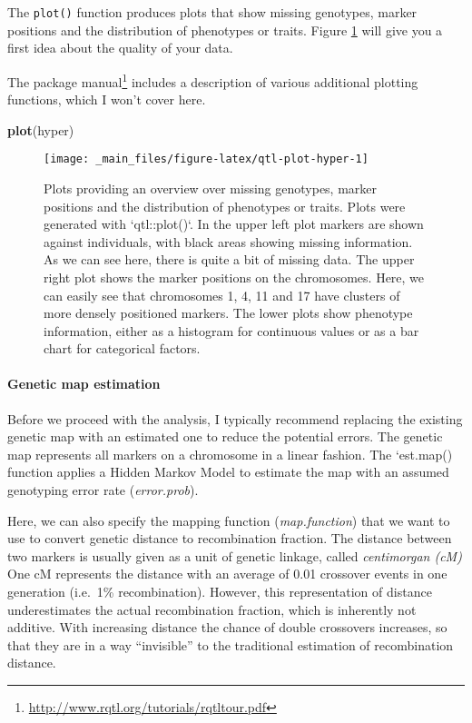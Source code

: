 \documentclass[12pt,]{krantz}
\newenvironment{Shaded}{\begin{snugshade}}{\end{snugshade}}
\newcommand{\KeywordTok}[1]{\textcolor[rgb]{0.27,0.27,0.27}{\textbf{{#1}}}}
\newcommand{\NormalTok}[1]{{#1}}
\let\oldparagraph\paragraph
\renewcommand{\paragraph}[1]{\oldparagraph{#1}\mbox{}}
\renewcommand{\href}[2]{#2\footnote{\url{#1}}}
\theoremstyle{definition}
\theoremstyle{definition}
\theoremstyle{remark}
\begin{document}
The \texttt{plot()} function produces plots that show missing genotypes,
marker positions and the distribution of phenotypes or traits. Figure
\ref{fig:qtl-plot-hyper} will give you a first idea about the quality of
your data.

The \href{http://www.rqtl.org/tutorials/rqtltour.pdf}{package manual}
includes a description of various additional plotting functions, which I
won't cover here.

\begin{Shaded}
\begin{Highlighting}[]
\KeywordTok{plot}\NormalTok{(hyper)}
\end{Highlighting}
\end{Shaded}

\begin{figure}

{\centering \texttt{[image: \_main\_files/figure-latex/qtl-plot-hyper-1]} 

}

\caption{Plots providing an overview over missing genotypes, marker positions and the distribution of phenotypes or traits. Plots were generated with `qtl::plot()`. In the upper left plot markers are shown against individuals, with black areas showing missing information. As we can see here, there is quite a bit of missing data. The upper right plot shows the marker positions on the chromosomes. Here, we can easily see that chromosomes 1, 4, 11 and 17 have clusters of more densely positioned markers. The lower plots show phenotype information, either as a histogram for continuous values or as a bar chart for categorical factors.}\label{fig:qtl-plot-hyper}
\end{figure}

\paragraph{Genetic map estimation}\label{genetic-map-estimation}

Before we proceed with the analysis, I typically recommend replacing the
existing genetic map with an estimated one to reduce the potential
errors. The genetic map represents all markers on a chromosome in a
linear fashion. The `est.map() function applies a Hidden Markov Model
\citep{Lander01041987} to estimate the map with an assumed genotyping
error rate (\emph{error.prob}).

Here, we can also specify the mapping function (\emph{map.function})
that we want to use to convert genetic distance to recombination
fraction. The distance between two markers is usually given as a unit of
genetic linkage, called \emph{centimorgan (cM)} One cM represents the
distance with an average of 0.01 crossover events in one generation
(i.e.~1\% recombination). However, this representation of distance
underestimates the actual recombination fraction, which is inherently
not additive. With increasing distance the chance of double crossovers
increases, so that they are in a way ``invisible'' to the traditional
estimation of recombination distance.
\end{document}
